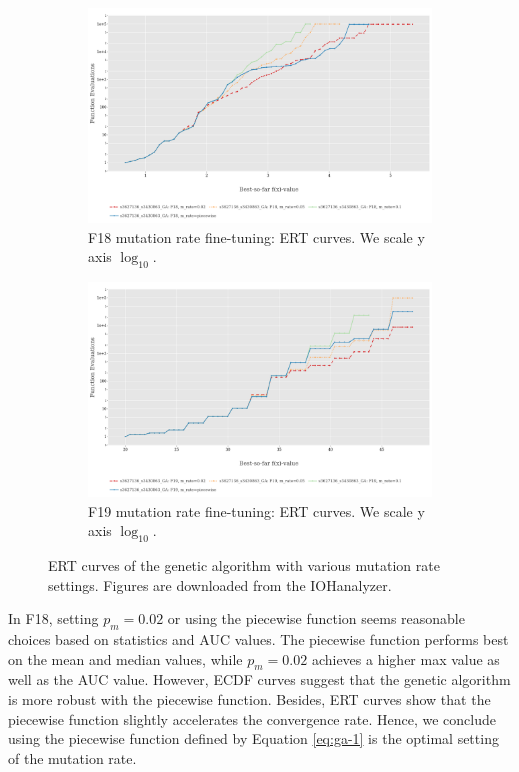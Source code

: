 \documentclass{article}
\begin{document}
\begin{figure}[!ht]
    \begin{subfigure}[h]{0.95\linewidth}
        \includegraphics[width=\linewidth]{ga/f18/mrate_ert.png}
        \caption{F18 mutation rate fine-tuning: ERT curves. We scale y axis $\log_{10}$.}
    \end{subfigure}
    \hfill
    \begin{subfigure}[h]{0.95\linewidth}
        \includegraphics[width=\linewidth]{ga/f19/mrate_ert.png}
        \caption{F19 mutation rate fine-tuning: ERT curves. We scale y axis $\log_{10}$.}
    \end{subfigure}
    \caption{ERT curves of the genetic algorithm with various mutation rate settings. Figures are downloaded from the IOHanalyzer.}
    \label{fig:experi-ga-mrate-ert}
\end{figure}

In F18, setting $p_m = 0.02$ or using the piecewise function seems reasonable choices based on statistics and AUC values. The piecewise function performs best on the mean and median values, while $p_m = 0.02$ achieves a higher max value as well as the AUC value. However, ECDF curves suggest that the genetic algorithm is more robust with the piecewise function. Besides, ERT curves show that the piecewise function slightly accelerates the convergence rate. Hence, we conclude using the piecewise function defined by Equation \ref{eq:ga-1} is the optimal setting of the mutation rate.
\end{document}
